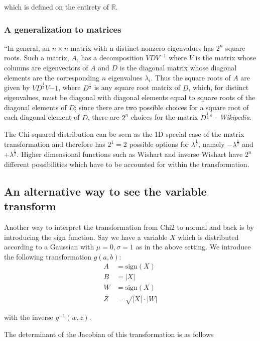 which is defined on the entirety of $\mathbb{R}$.

\subsubsection{A generalization to matrices}

``In general, an $n\times n$ matrix with n distinct nonzero eigenvalues has $2^n$ square roots. Such a matrix, $A$, has a decomposition $VDV^{-1}$ where $V$ is the matrix whose columns are eigenvectors of $A$ and $D$ is the diagonal matrix whose diagonal elements are the corresponding $n$ eigenvalues $\lambda_i$. Thus the square roots of $A$ are given by $VD^{\frac{1}{2}} V{-1}$, where $D^\frac{1}{2}$ is any square root matrix of $D$, which, for distinct eigenvalues, must be diagonal with diagonal elements equal to square roots of the diagonal elements of $D$; since there are two possible choices for a square root of each diagonal element of $D$, there are $2^n$ choices for the matrix $D^{\frac{1}{2}}$'' - \textit{Wikipedia}. 

The Chi-squared distribution can be seen as the 1D special case of the matrix transformation and therefore has $2^1=2$ possible options for $\lambda^{\frac{1}{2}}$, namely $-\lambda^{\frac{1}{2}}$ and $+\lambda^{\frac{1}{2}}$. Higher dimensional functions such as Wishart and inverse Wishart have $2^n$ different possibilities which have to be accounted for within the transformation. 

\subsection*{An alternative way to see the variable transform}

Another way to interpret the transformation from Chi2 to normal and back is by introducing the sign function. Say we have a variable $X$ which is distributed according to a Gaussian with $\mu=0, \sigma=1$ as in the above setting. We introduce the following transformation $g(a,b)$:
\begin{align*}
	A &= \text{sign}(X) \\
	B &= |X| \\
	W &= \text{sign}(X) \\
	Z &= \sqrt{|X|} \cdot |W|
\end{align*}

with the inverse $g^{-1}(w,z)$.

The determinant of the Jacobian of this transformation is as follows

